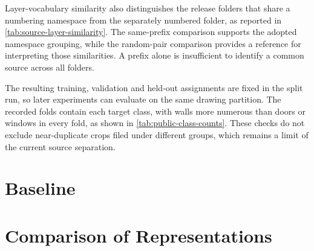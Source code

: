 Layer-vocabulary similarity also distinguishes the release folders that share a
numbering namespace from the separately numbered folder, as reported in
\cref{tab:source-layer-similarity}.
The same-prefix comparison supports the adopted namespace grouping, while the
random-pair comparison provides a reference for interpreting those similarities.
A prefix alone is insufficient to identify a common source across all folders.

\begin{table}[htbp]
  \centering
  \small
  \caption{Layer-vocabulary Jaccard similarities recorded by the source audit.
  Similarity supports a grouping convention, but does not verify building identity.}
  \label{tab:source-layer-similarity}
  
\end{table}

The resulting training, validation and held-out assignments are fixed in the split
run, so later experiments can evaluate on the same drawing partition.
The recorded folds contain each target class, with walls more numerous than doors
or windows in every fold, as shown in \cref{tab:public-class-counts}.
These checks do not exclude near-duplicate crops filed under different groups,
which remains a limit of the current source separation.

\section{Baseline}
\label{sec:baseline}

\section{Comparison of Representations}
\label{sec:representation-comparison}

